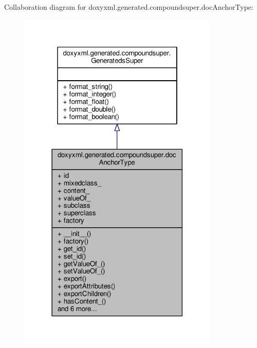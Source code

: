 Collaboration diagram for doxyxml.\+generated.\+compoundsuper.\+doc\+Anchor\+Type\+:
\nopagebreak
\begin{figure}[H]
\begin{center}
\leavevmode
\includegraphics[width=270pt]{d3/dad/classdoxyxml_1_1generated_1_1compoundsuper_1_1docAnchorType__coll__graph}
\end{center}
\end{figure}
